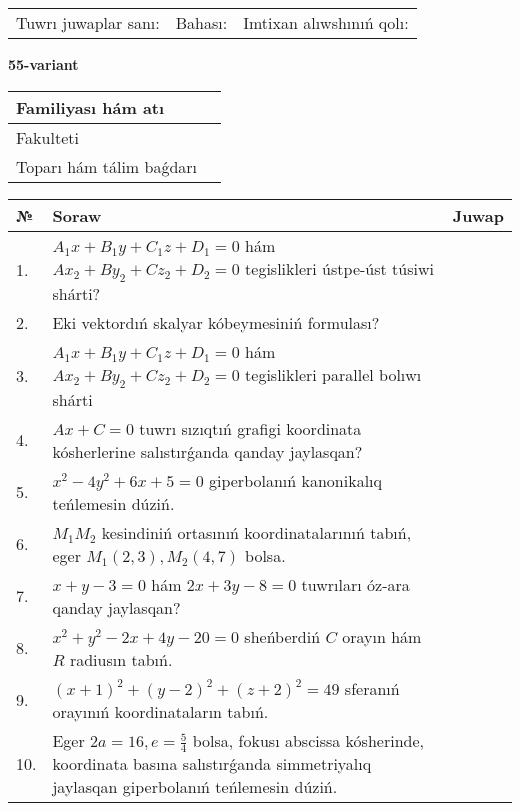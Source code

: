\documentclass{article}
\begin{document}
\vspace{1cm}

\begin{tabular}{lll}
Tuwrı juwaplar sanı: \underline{\hspace{1.5cm}} & 
Bahası: \underline{\hspace{1.5cm}} & 
Imtixan alıwshınıń qolı: \underline{\hspace{2cm}} \\
\end{tabular}

\egroup

\newpage


\textbf{55-variant}\\

\bgroup
\def\arraystretch{1.6} %

\begin{tabular}{|m{5.7cm}|m{9.5cm}|}
\hline
Familiyası hám atı & \\
\hline
Fakulteti  & \\
\hline
Toparı hám tálim baǵdarı  & \\
\hline
\end{tabular}

\vspace{1cm}

\begin{tabular}{|m{0.7cm}|m{10cm}|m{4cm}|}
\hline
№ & Soraw & Juwap \\
\hline
1. & $A_1x+B_1y+C_1z+D_1=0$ hám $Ax_2+By_2+Cz_2+D_2=0$ tegislikleri ústpe-úst túsiwi shárti? &  \\
\hline
2. & Eki vektordıń skalyar kóbeymesiniń formulası? &  \\
\hline
3. & $A_1x+B_1y+C_1z+D_1=0$ hám $Ax_2+By_2+Cz_2+D_2=0$ tegislikleri parallel bolıwı shárti &  \\
\hline
4. & $Ax+C=0$ tuwrı sızıqtıń grafigi koordinata kósherlerine salıstırǵanda qanday jaylasqan? &  \\
\hline
5. & $x^{2}-4y^{2}+6x+5=0$ giperbolanıń kanonikalıq teńlemesin dúziń. &  \\
\hline
6. & $M_{1}M_{2}$ kesindiniń ortasınıń koordinatalarınıń tabıń, eger $M_{1} (2, 3), M_{2} (4, 7)$ bolsa. &  \\
\hline
7. & $x+y-3=0$ hám $2x+3y-8=0$ tuwrıları óz-ara qanday jaylasqan? &  \\
\hline
8. & $x^{2}+y^{2}-2x+4y-20=0$ sheńberdiń $C$ orayın hám $R$ radiusın tabıń. &  \\
\hline
9. & $(x+1)^{2}+(y-2) ^{2}+(z+2) ^{2}=49$ sferanıń orayınıń koordinataların tabıń. &  \\
\hline
10. & Eger $2a=16, e=\frac{5}{4}$ bolsa, fokusı abscissa kósherinde, koordinata basına salıstırǵanda simmetriyalıq jaylasqan giperbolanıń teńlemesin dúziń. &  \\
\hline
\end{tabular}
\end{document}
